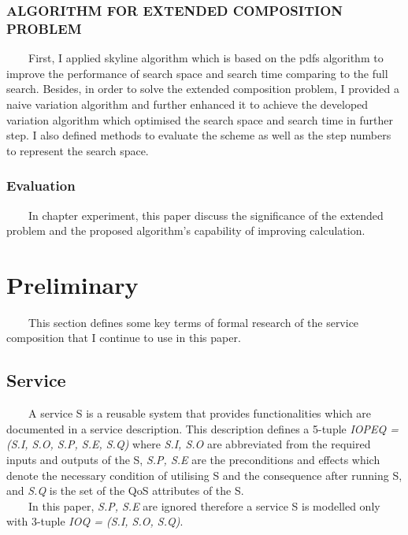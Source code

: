 \documentclass[senior,final,11pt]{iscs-thesis}
\begin{document}
\subsection{ALGORITHM FOR EXTENDED COMPOSITION PROBLEM}
~~~~First, I applied skyline algorithm which is based on the pdfs algorithm to improve the performance of search space and search time comparing to the full search.
Besides, in order to solve the extended composition problem, I provided a naive variation algorithm and further enhanced it to achieve the developed variation algorithm which optimised the search space and search time in further step.
I also defined methods to evaluate the scheme as well as the step numbers to represent the search space.
\subsection{Evaluation}
~~~~In chapter experiment, this paper discuss the significance of the extended problem and the proposed algorithm's capability of improving calculation.

\chapter{Preliminary}%
~~~~This section defines some key terms of formal research of the service composition that I continue to use in this paper.
\section{Service}
~~~~A service S is a reusable system that provides functionalities which are documented in a service description. This description defines a 5-tuple {\em IOPEQ = (S.I, S.O, S.P, S.E, S.Q)} where {\em S.I, S.O} are abbreviated from the required inputs and outputs of the S, {\em S.P, S.E} are the preconditions and effects which denote the necessary condition of utilising S and the consequence after running S, and {\em S.Q} is the set of the QoS attributes of the S\cite{wagner2011qos}. \\
~~~~In this paper, {\em S.P, S.E} are ignored therefore a service S is modelled only with 3-tuple {\em IOQ = (S.I, S.O, S.Q)}.
\end{document}
